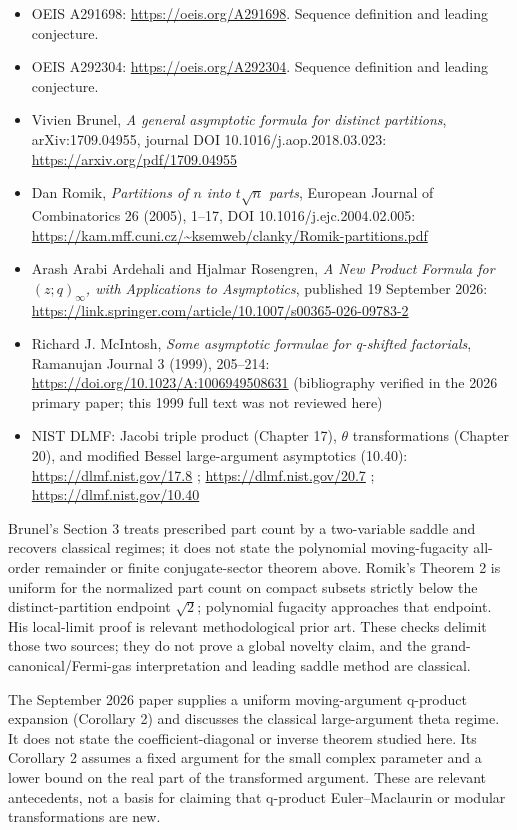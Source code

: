 \documentclass[11pt,letterpaper]{article}
\providecommand{\tightlist}{\setlength{\itemsep}{0pt}\setlength{\parskip}{0pt}}
\begin{document}
\begin{itemize}
\tightlist
\item
  OEIS A291698: \url{https://oeis.org/A291698}. Sequence definition and leading conjecture.
\item
  OEIS A292304: \url{https://oeis.org/A292304}. Sequence definition and leading conjecture.
\item
  Vivien Brunel, \emph{A general asymptotic formula for distinct
  partitions}, arXiv:1709.04955, journal DOI
  10.1016/j.aop.2018.03.023: \url{https://arxiv.org/pdf/1709.04955}
\item
  Dan Romik, \emph{Partitions of \(n\) into \(t\sqrt n\) parts},
  European Journal of Combinatorics 26 (2005), 1--17, DOI
  10.1016/j.ejc.2004.02.005:
  \url{https://kam.mff.cuni.cz/~ksemweb/clanky/Romik-partitions.pdf}
\item
  Arash Arabi Ardehali and Hjalmar Rosengren, \emph{A New Product
  Formula for \((z;q)_\infty\), with Applications to Asymptotics},
  published 19 September 2026:
  \url{https://link.springer.com/article/10.1007/s00365-026-09783-2}
\item
  Richard J. McIntosh, \emph{Some asymptotic formulae for q-shifted
  factorials}, Ramanujan Journal 3 (1999), 205--214:
  \url{https://doi.org/10.1023/A:1006949508631} (bibliography verified in the
  2026 primary paper; this 1999 full text was not reviewed here)
\item
  NIST DLMF: Jacobi triple product (Chapter 17), \(\theta\)
  transformations (Chapter 20), and modified Bessel large-argument
  asymptotics (10.40): \url{https://dlmf.nist.gov/17.8} ;
  \url{https://dlmf.nist.gov/20.7} ; \url{https://dlmf.nist.gov/10.40}
\end{itemize}

Brunel's Section 3 treats prescribed part count by a two-variable
saddle and recovers classical regimes; it does not state the polynomial
moving-fugacity all-order remainder or finite conjugate-sector theorem
above. Romik's Theorem 2 is uniform for the normalized part count on
compact subsets strictly below the distinct-partition endpoint
\(\sqrt2\); polynomial fugacity approaches that endpoint. His
local-limit proof is relevant methodological prior art. These checks
delimit those two sources; they do not prove a global novelty claim, and
the grand-canonical/Fermi-gas interpretation and leading saddle method
are classical.

The September 2026 paper supplies a uniform moving-argument q-product
expansion (Corollary 2) and discusses the classical large-argument
theta regime. It does not state the coefficient-diagonal or inverse
theorem studied here. Its Corollary 2 assumes a fixed argument for the
small complex parameter and a lower bound on the real part of the
transformed argument. These are relevant antecedents, not a basis for
claiming that q-product Euler--Maclaurin or modular transformations are
new.
\end{document}
